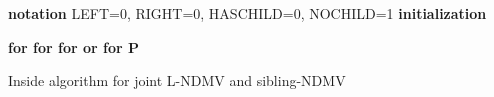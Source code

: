 \documentclass[11pt]{article}
\begin{document}
\begin{algorithm}[t]
\footnotesize
\SetAlgoLined
\textbf{notation} LEFT=0, RIGHT=0, HASCHILD=0, NOCHILD=1 \newline
 \textbf{initialization}
  
  
  
   \newline
\bfseries{for}  \newline
 \hspace*{1em} \bfseries{for} \newline
 \hspace*{2em}  \newline
 \hspace*{2em} \bfseries{for}  \bfseries{or}   \newline
 \hspace*{3em}  \newline
  \hspace*{3em}  \newline
   \hspace*{3em}  \newline
  \hspace*{3em}  \newline
     \hspace*{3em}  \newline
     \hspace*{3em}  \newline
     \hspace*{3em}  \newline
  \hspace*{3em}  \newline
\bfseries{for}  \newline
\hspace*{1em}  \newline
 \newline
\Return P
 \caption{Inside algorithm for joint L-NDMV and sibling-NDMV} 
 \label{eisner joint}
\end{algorithm}
\end{document}

